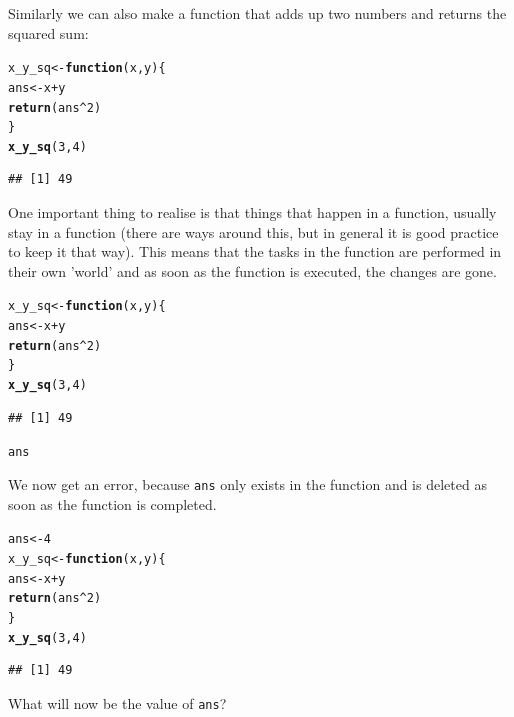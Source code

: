 \documentclass{article}\usepackage[]{graphicx}\usepackage[]{color}
\makeatletter
\newcommand{\hlnum}[1]{\textcolor[rgb]{0.686,0.059,0.569}{#1}}%
\newcommand{\hlopt}[1]{\textcolor[rgb]{0,0,0}{#1}}%
\newcommand{\hlstd}[1]{\textcolor[rgb]{0.345,0.345,0.345}{#1}}%
\newcommand{\hlkwa}[1]{\textcolor[rgb]{0.161,0.373,0.58}{\textbf{#1}}}%
\newcommand{\hlkwb}[1]{\textcolor[rgb]{0.69,0.353,0.396}{#1}}%
\newcommand{\hlkwc}[1]{\textcolor[rgb]{0.333,0.667,0.333}{#1}}%
\newcommand{\hlkwd}[1]{\textcolor[rgb]{0.737,0.353,0.396}{\textbf{#1}}}%
\newenvironment{kframe}{%
 \def\at@end@of@kframe{}%
 \ifinner\ifhmode%
  \def\at@end@of@kframe{\end{minipage}}%
  \begin{minipage}{\columnwidth}%
 \fi\fi%
 \def\FrameCommand##1{\hskip\@totalleftmargin \hskip-\fboxsep
 \colorbox{shadecolor}{##1}\hskip-\fboxsep
     \hskip-\linewidth \hskip-\@totalleftmargin \hskip\columnwidth}%
 \MakeFramed {\advance\hsize-\width
   \@totalleftmargin\z@ \linewidth\hsize
   \@setminipage}}%
 {\par\unskip\endMakeFramed%
 \at@end@of@kframe}
\newenvironment{knitrout}{}{} %
\makeatother
\begin{document}
\begin{mdframed}
Similarly we can also make a function that adds up two numbers and returns the squared sum:
\begin{knitrout}
\color{fgcolor}\begin{kframe}
\begin{alltt}
\hlstd{x_y_sq} \hlkwb{<-} \hlkwa{function}\hlstd{(}\hlkwc{x}\hlstd{,}\hlkwc{y}\hlstd{)\{}
  \hlstd{ans} \hlkwb{<-} \hlstd{x} \hlopt{+} \hlstd{y}
  \hlkwd{return}\hlstd{(ans}\hlopt{^}\hlnum{2}\hlstd{)}
\hlstd{\}}
\hlkwd{x_y_sq}\hlstd{(}\hlnum{3}\hlstd{,} \hlnum{4}\hlstd{)}
\end{alltt}
\begin{verbatim}
## [1] 49
\end{verbatim}
\end{kframe}
\end{knitrout}
One important thing to realise is that things that happen in a function, usually stay in a function (there are ways around this, but in general it is good practice to keep it that way). This means that the tasks in the function are performed in their own 'world' and as soon as the function is executed, the changes are gone.
\begin{knitrout}
\color{fgcolor}\begin{kframe}
\begin{alltt}
\hlstd{x_y_sq} \hlkwb{<-} \hlkwa{function}\hlstd{(}\hlkwc{x}\hlstd{,}\hlkwc{y}\hlstd{)\{}
  \hlstd{ans} \hlkwb{<-} \hlstd{x} \hlopt{+} \hlstd{y}
  \hlkwd{return}\hlstd{(ans}\hlopt{^}\hlnum{2}\hlstd{)}
\hlstd{\}}
\hlkwd{x_y_sq}\hlstd{(}\hlnum{3}\hlstd{,} \hlnum{4}\hlstd{)}
\end{alltt}
\begin{verbatim}
## [1] 49
\end{verbatim}
\begin{alltt}
\hlstd{ans}
\end{alltt}


{\ttfamily\noindent\bfseries\color{errorcolor}{\#\# Error in eval(expr, envir, enclos): object 'ans' not found}}\end{kframe}
\end{knitrout}
We now get an error, because \texttt{ans} only exists in the function and is deleted as soon as the function is completed. 
\begin{knitrout}
\color{fgcolor}\begin{kframe}
\begin{alltt}
\hlstd{ans} \hlkwb{<-} \hlnum{4}
\hlstd{x_y_sq} \hlkwb{<-} \hlkwa{function}\hlstd{(}\hlkwc{x}\hlstd{,}\hlkwc{y}\hlstd{)\{}
  \hlstd{ans} \hlkwb{<-} \hlstd{x} \hlopt{+} \hlstd{y}
  \hlkwd{return}\hlstd{(ans}\hlopt{^}\hlnum{2}\hlstd{)}
\hlstd{\}}
\hlkwd{x_y_sq}\hlstd{(}\hlnum{3}\hlstd{,} \hlnum{4}\hlstd{)}
\end{alltt}
\begin{verbatim}
## [1] 49
\end{verbatim}
\end{kframe}
\end{knitrout}
What will now be the value of \texttt{ans}?


\end{mdframed}
\end{document}
